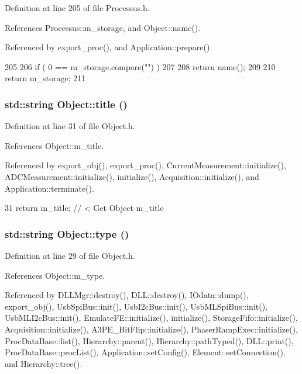 Definition at line 205 of file Processus.h.

References Processus::m\_\-storage, and Object::name().

Referenced by export\_\-proc(), and Application::prepare().


\begin{DoxyCode}
205                        {
206     if ( 0 == m_storage.compare("") )
207     {
208       return name();
209     }
210     return m_storage;
211   }
\end{DoxyCode}
\hypertarget{classObject_a73a0f1a41828fdd8303dd662446fb6c3}{
\subsubsection[{title}]{\setlength{\rightskip}{0pt plus 5cm}std::string Object::title ()}}
\label{classObject_a73a0f1a41828fdd8303dd662446fb6c3}


Definition at line 31 of file Object.h.

References Object::m\_\-title.

Referenced by export\_\-obj(), export\_\-proc(), CurrentMeasurement::initialize(), ADCMeasurement::initialize(), initialize(), Acquisition::initialize(), and Application::terminate().


\begin{DoxyCode}
31 { return m_title;      } // < Get Object m_title
\end{DoxyCode}
\hypertarget{classObject_a84f99f70f144a83e1582d1d0f84e4e62}{
\subsubsection[{type}]{\setlength{\rightskip}{0pt plus 5cm}std::string Object::type ()}}
\label{classObject_a84f99f70f144a83e1582d1d0f84e4e62}


Definition at line 29 of file Object.h.

References Object::m\_\-type.

Referenced by DLLMgr::destroy(), DLL::destroy(), IOdata::dump(), export\_\-obj(), UsbSpiBus::init(), UsbI2cBus::init(), UsbMLSpiBus::init(), UsbMLI2cBus::init(), EmulateFE::initialize(), initialize(), StorageFifo::initialize(), Acquisition::initialize(), A3PE\_\-BitFlip::initialize(), PhaserRampExec::initialize(), ProcDataBase::list(), Hierarchy::parent(), Hierarchy::pathTyped(), DLL::print(), ProcDataBase::procList(), Application::setConfig(), Element::setConnection(), and Hierarchy::tree().


